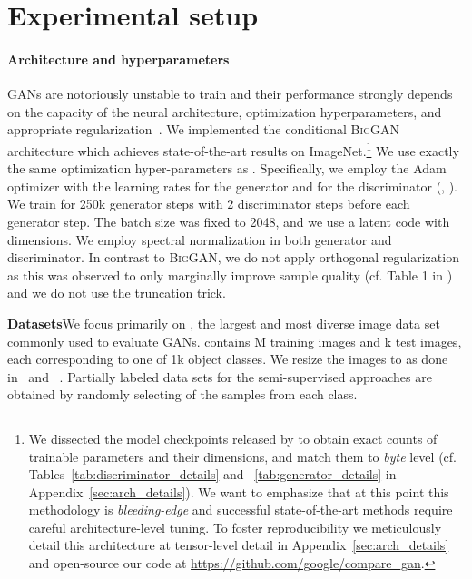 \documentclass{article}
\newcommand{\biggan}{\textsc{BigGAN}}
\begin{document}
\section{Experimental setup}\label{exp:setup}

\paragraph{Architecture and hyperparameters} 
GANs are notoriously unstable to train and their performance strongly depends on the capacity of the neural architecture, optimization hyperparameters, and appropriate regularization~\cite{lucic2018,kurach2018gan}. We implemented the conditional \biggan{} architecture \cite{brock2018large} which achieves state-of-the-art results on ImageNet.\footnote{We dissected the model checkpoints released by \citet{brock2018large} to obtain exact counts of trainable parameters and their dimensions, and match them to \emph{byte} level (cf. Tables~\ref{tab:discriminator_details} and ~\ref{tab:generator_details} in Appendix~\ref{sec:arch_details}). We want to emphasize that at this point this methodology is \emph{bleeding-edge} and successful state-of-the-art methods require careful architecture-level tuning. To foster reproducibility we meticulously detail this architecture at tensor-level detail in Appendix~\ref{sec:arch_details} and open-source our code at \url{https://github.com/google/compare_gan}.}  We use exactly the same optimization hyper-parameters as \citet{brock2018large}. Specifically, we employ the Adam optimizer with the learning rates  for the generator and  for the discriminator (, ). We train for 250k generator steps with 2 discriminator steps before each generator step. The batch size was fixed to 2048, and we use a latent code  with  dimensions. We employ spectral normalization in both generator and discriminator. In contrast to \biggan{}, we do not apply orthogonal regularization as this was observed to only marginally improve sample quality (cf. Table 1 in \citet{brock2018large}) and we do not use the truncation trick.


\textbf{Datasets}\quad We focus primarily on \imagenet{}, the largest and most diverse image data set commonly used to evaluate GANs. \imagenet{} contains M training images and k test images, each corresponding to one of 1k object classes. We resize the images to  as done in~\citet{miyato2018cgans} and ~\citet{zhang2018self}. Partially labeled data sets for the semi-supervised approaches are obtained by randomly selecting  of the samples from each class.
\end{document}
